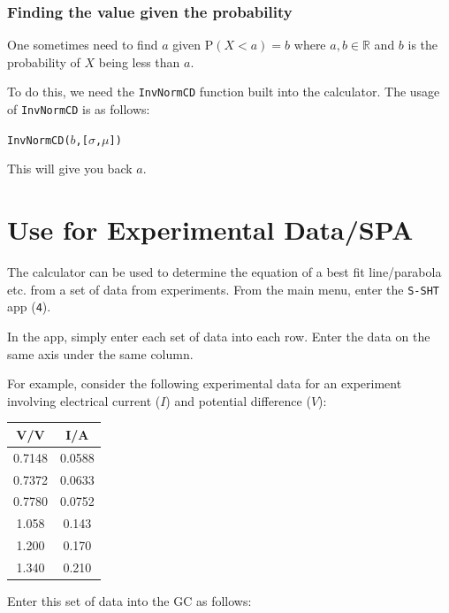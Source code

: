 \documentclass[a5paper,draft]{memoir}
\def\code#1{\texttt{#1}}
\newcommand{\addtoindex}[1]{#1\index{#1}}
\begin{document}
\subsubsection{Finding the value given the probability}
One sometimes need to find $a$ given $\textrm{P}(X < a) = b$ where $a,b \in \mathbb{R}$ and $b$ is the probability of $X$ being less than $a$. 

To do this, we need the \code{\addtoindex{InvNormCD}} function built into the calculator. The usage of \code{InvNormCD} is as follows:
\begin{center}
	\code{InvNormCD($b$,[$\sigma$,$\mu$])}
\end{center}

This will give you back $a$.

\section{Use for Experimental Data/SPA}
The calculator can be used to determine the equation of a best fit line/parabola etc. from a set of data from experiments. From the main menu, enter the \code{S-SHT} app (\code{4}). 

In the app, simply enter each set of data into each row. Enter the data on the same axis under the same column.

For example, consider the following experimental data for an experiment involving electrical current ($I$) and potential difference ($V$): 

\begin{center}
	\setlength{\tabcolsep}{10pt}
	\renewcommand{\arraystretch}{1.2}
	\begin{tabular}{|c|c|}
		\hline
		\textbf{V/V}	& \textbf{I/A} \\
		\hline
		0.7148			& 0.0588 \\
		\hline
		0.7372			& 0.0633 \\
		\hline
		0.7780			& 0.0752 \\
		\hline
		1.058			& 0.143 \\
		\hline
		1.200			& 0.170 \\
		\hline
		1.340			& 0.210 \\
		\hline
	\end{tabular}
\end{center}

Enter this set of data into the GC as follows:
\end{document}
